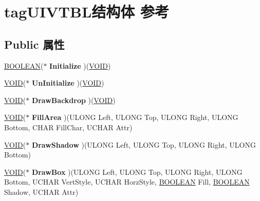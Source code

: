 \hypertarget{structtag_u_i_v_t_b_l}{}\section{tag\+U\+I\+V\+T\+B\+L结构体 参考}
\label{structtag_u_i_v_t_b_l}
\subsection*{Public 属性}
\begin{DoxyCompactItemize}
\item 
\mbox{\label{structtag_u_i_v_t_b_l_ab842e548f2aca2eaf54c54c52f10fb7f}} 
\hyperlink{_processor_bind_8h_a112e3146cb38b6ee95e64d85842e380a}{B\+O\+O\+L\+E\+AN}($\ast$ {\bfseries Initialize} )(\hyperlink{interfacevoid}{V\+O\+ID})
\item 
\mbox{\label{structtag_u_i_v_t_b_l_ac03503930e34d6111caff404bc4b55c8}} 
\hyperlink{interfacevoid}{V\+O\+ID}($\ast$ {\bfseries Un\+Initialize} )(\hyperlink{interfacevoid}{V\+O\+ID})
\item 
\mbox{\label{structtag_u_i_v_t_b_l_a0ed14632914a18bba6f87b4dc6e23148}} 
\hyperlink{interfacevoid}{V\+O\+ID}($\ast$ {\bfseries Draw\+Backdrop} )(\hyperlink{interfacevoid}{V\+O\+ID})
\item 
\mbox{\label{structtag_u_i_v_t_b_l_a291836d91a0b0a1abdb8a6b299e00206}} 
\hyperlink{interfacevoid}{V\+O\+ID}($\ast$ {\bfseries Fill\+Area} )(U\+L\+O\+NG Left, U\+L\+O\+NG Top, U\+L\+O\+NG Right, U\+L\+O\+NG Bottom, C\+H\+AR Fill\+Char, U\+C\+H\+AR Attr)
\item 
\mbox{\label{structtag_u_i_v_t_b_l_ac14a304609e4e7fb5a8a430698d90c77}} 
\hyperlink{interfacevoid}{V\+O\+ID}($\ast$ {\bfseries Draw\+Shadow} )(U\+L\+O\+NG Left, U\+L\+O\+NG Top, U\+L\+O\+NG Right, U\+L\+O\+NG Bottom)
\item 
\mbox{\label{structtag_u_i_v_t_b_l_a32aa49ba0bddae7d410d559893ed586d}} 
\hyperlink{interfacevoid}{V\+O\+ID}($\ast$ {\bfseries Draw\+Box} )(U\+L\+O\+NG Left, U\+L\+O\+NG Top, U\+L\+O\+NG Right, U\+L\+O\+NG Bottom, U\+C\+H\+AR Vert\+Style, U\+C\+H\+AR Horz\+Style, \hyperlink{_processor_bind_8h_a112e3146cb38b6ee95e64d85842e380a}{B\+O\+O\+L\+E\+AN} Fill, \hyperlink{_processor_bind_8h_a112e3146cb38b6ee95e64d85842e380a}{B\+O\+O\+L\+E\+AN} Shadow, U\+C\+H\+AR Attr)

\end{DoxyCompactItemize}
